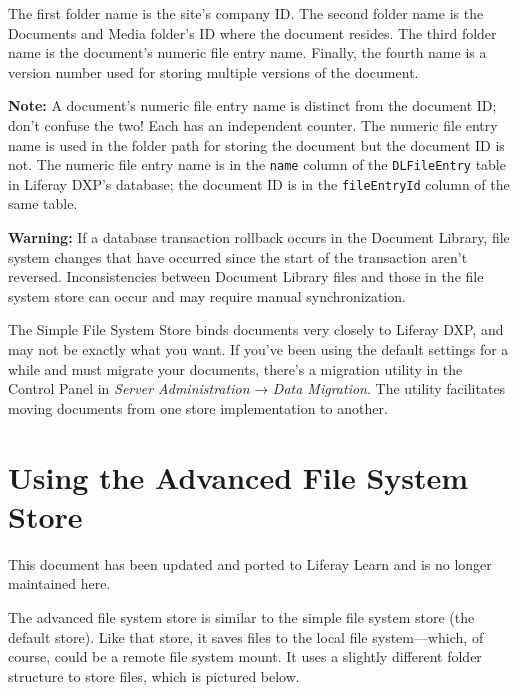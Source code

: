 The first folder name is the site's company ID. The second folder name
is the Documents and Media folder's ID where the document resides. The
third folder name is the document's numeric file entry name. Finally,
the fourth name is a version number used for storing multiple versions
of the document.

\noindent\hrulefill

\textbf{Note:} A document's numeric file entry name is distinct from the
document ID; don't confuse the two! Each has an independent counter. The
numeric file entry name is used in the folder path for storing the
document but the document ID is not. The numeric file entry name is in
the \texttt{name} column of the \texttt{DLFileEntry} table in Liferay
DXP's database; the document ID is in the \texttt{fileEntryId} column of
the same table.

\noindent\hrulefill

\noindent\hrulefill

\textbf{Warning:} If a database transaction rollback occurs in the
Document Library, file system changes that have occurred since the start
of the transaction aren't reversed. Inconsistencies between Document
Library files and those in the file system store can occur and may
require manual synchronization.

\noindent\hrulefill

The Simple File System Store binds documents very closely to Liferay
DXP, and may not be exactly what you want. If you've been using the
default settings for a while and must migrate your documents, there's a
migration utility in the Control Panel in \emph{Server Administration} →
\emph{Data Migration}. The utility facilitates moving documents from one
store implementation to another.

\chapter{Using the Advanced File System
Store}\label{using-the-advanced-file-system-store}

{This document has been updated and ported to Liferay Learn and is no
longer maintained here.}

The advanced file system store is similar to the simple file system
store (the default store). Like that store, it saves files to the local
file system---which, of course, could be a remote file system mount. It
uses a slightly different folder structure to store files, which is
pictured below.

